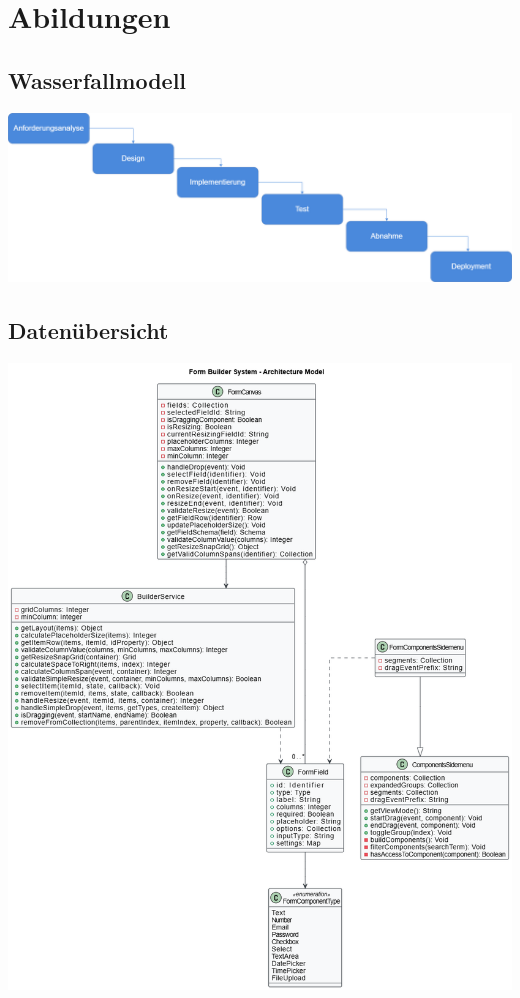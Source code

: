 \documentclass[a4paper,11pt]{article}
\begin{document}
\newpage
\section{Abildungen}
\subsection{Wasserfallmodell}
\includegraphics[width=1.1\textwidth]{waterfall.drawio}
\subsection{ Datenübersicht}
\includegraphics[width=1.1\textwidth]{UML Class digram.drawio}
\end{document}
